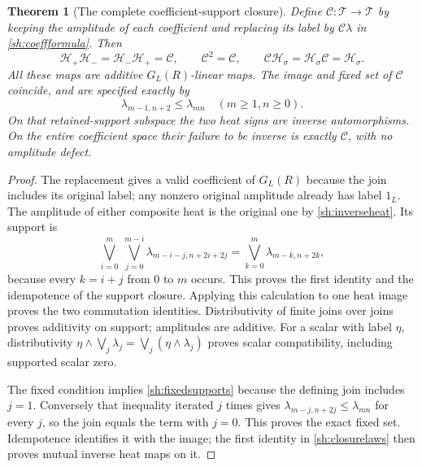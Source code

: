 \documentclass[11pt]{article}
\newtheorem{theorem}{Theorem}
\begin{document}
\begin{theorem}[The complete coefficient-support closure]
\label{sh:closure}
Define $\mathscr C:\mathscr T\to\mathscr T$ by keeping the
amplitude of each coefficient and replacing its label by
$\mathcal C\lambda$ in \eqref{sh:coeffformula}. Then
\begin{equation}\tag{SH33}\label{sh:closurelaws}
 \mathscr H_+\mathscr H_-=
 \mathscr H_-\mathscr H_+=\mathscr C,\qquad
 \mathscr C^2=\mathscr C,\qquad
 \mathscr C\mathscr H_\sigma=
 \mathscr H_\sigma\mathscr C=\mathscr H_\sigma.
\end{equation}
All these maps are additive $G_L(R)$-linear maps.
The image and fixed set of $\mathscr C$ coincide, and are
specified exactly by
\begin{equation}\tag{SH34}\label{sh:fixedsupports}
 \lambda_{m-1,n+2}\le\lambda_{mn}
       \quad(m\ge1,n\ge0).
\end{equation}
On that retained-support subspace the two heat signs are inverse
automorphisms. On the entire coefficient space their failure
to be inverse is exactly $\mathscr C$, with no amplitude defect.
\end{theorem}
\begin{proof}
The replacement gives a valid coefficient of $G_L(R)$ because
the join includes its original label; any nonzero original
amplitude already has label $1_L$. The amplitude of either
composite heat is the original one by \eqref{sh:inverseheat}.
Its support is
\[
 \bigvee_{i=0}^m\ \bigvee_{j=0}^{m-i}
       \lambda_{m-i-j,n+2i+2j}
 =\bigvee_{k=0}^m\lambda_{m-k,n+2k},
\]
because every $k=i+j$ from $0$ to $m$ occurs. This proves
the first identity and the idempotence of the support closure.
Applying this calculation to one heat image proves the two
commutation identities. Distributivity of finite joins over
joins proves additivity on support; amplitudes are additive.
For a scalar with label $\eta$, distributivity
$\eta\wedge\bigvee_j\lambda_j=
\bigvee_j(\eta\wedge\lambda_j)$ proves scalar compatibility,
including supported scalar zero.

The fixed condition implies \eqref{sh:fixedsupports} because
the defining join includes $j=1$. Conversely that inequality
iterated $j$ times gives
$\lambda_{m-j,n+2j}\le\lambda_{mn}$ for every $j$, so the
join equals the term with $j=0$. This proves the exact fixed
set. Idempotence identifies it with the image; the first
identity in \eqref{sh:closurelaws} then proves mutual inverse
heat maps on it.
\end{proof}
\end{document}
